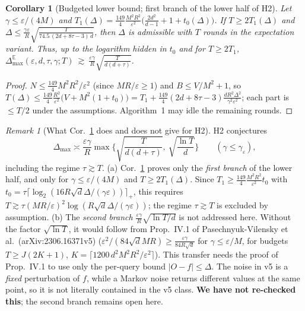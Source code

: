 \documentclass[11pt,a4paper]{article}
\numberwithin{equation}{section}
\newtheorem{corollary}[theorem]{Corollary}
\theoremstyle{definition}
\theoremstyle{remark}
\newtheorem{remark}[theorem]{Remark}
\newcommand{\E}{\mathbb E}\newcommand{\R}{\mathbb R}\newcommand{\N}{\mathbb N}\newcommand{\Prob}{\mathbb P}
\newcommand{\Dmax}{\Delta_{\max}}\newcommand{\Dcp}{\Delta_{\rm cp}}
\begin{document}
\begin{corollary}[Budgeted lower bound; first branch of the lower half of H2]\label{cor:lower}
Let $\gamma\le\varepsilon/(4M)$ and $T_1(\Delta)=\frac{149}4\frac{M^2R^2}{\varepsilon^2}\big(\frac{2d^2}{d-1}+1+t_0(\Delta)\big)$. If $T\ge2T_1(\Delta)$ and
$\Delta\le\frac{\gamma\varepsilon}R\sqrt{\frac{T}{74.5\,(2d+8\tau-3)\,d}}$, then $\Delta$ is admissible with $T$ rounds in the expectation variant. Thus, up to the logarithm hidden in $t_0$ and for $T\ge2T_1$,
$\Dmax^{\E}(\varepsilon,d,\tau,\gamma;T)\ \gtrsim\ \frac{\varepsilon\gamma}R\sqrt{\frac T{d(d+\tau)}}$.
\end{corollary}
\begin{proof}
$N\le\frac{149}4M^2R^2/\varepsilon^2$ (since $MR/\varepsilon\ge1$) and $B\le V/M^2+1$, so $T(\Delta)\le\frac{149}4\frac{R^2}{\varepsilon^2}\big(V+M^2(1+t_0)\big)=T_1+\frac{149}4(2d+8\tau-3)\frac{dR^2\Delta^2}{\gamma^2\varepsilon^2}$; each part is $\le T/2$ under the assumptions. Algorithm~1 may idle the remaining rounds.
\end{proof}
\begin{remark}[What Cor.~\ref{cor:lower} does and does not give for H2]\label{rem:h2}
H2 conjectures
\[\Dmax\asymp\frac{\varepsilon\gamma}R\max\Big\{\sqrt{\frac T{d(d+\tau)}},\ \sqrt{\frac{\ln T}d}\Big\}\qquad(\gamma\le\gamma_\varepsilon),\]
including the regime $\tau\gtrsim T$.
(a) Cor.~\ref{cor:lower} proves only the \emph{first branch} of the lower half, and only for $\gamma\le\varepsilon/(4M)$ and $T\ge2T_1(\Delta)$. Since $T_1\ge\frac{149}4\frac{M^2R^2}{\varepsilon^2}t_0$ with $t_0=\tau\lceil\log_2(16R\sqrt d\Delta/(\gamma\varepsilon))\rceil_+$, this requires $T\gtrsim\tau(MR/\varepsilon)^2\log(R\sqrt d\Delta/(\gamma\varepsilon))$; the regime $\tau\gtrsim T$ is excluded by assumption.
(b) The \emph{second branch} $\frac{\varepsilon\gamma}R\sqrt{\ln T/d}$ is not addressed here. Without the factor $\sqrt{\ln T}$, it would follow from Prop.~IV.1 of Pasechnyuk-Vilensky et al.\ (arXiv:\allowbreak2306.16371v5) ($\varepsilon^2/(84\sqrt dMR)\ge\frac{\varepsilon\gamma}{84R\sqrt d}$ for $\gamma\le\varepsilon/M$, for budgets $T\ge J(2K+1)$, $K=\lceil1200\,d^2M^2R^2/\varepsilon^2\rceil$). This transfer needs the proof of Prop.~IV.1 to use only the per-query bound $|O-f|\le\Delta$. The noise in v5 is a \emph{fixed} perturbation of $f$, while a Markov noise returns different values at the same point, so it is not literally contained in the v5 class. \textbf{We have not re-checked this}; the second branch remains open here.
\end{remark}
\end{document}

